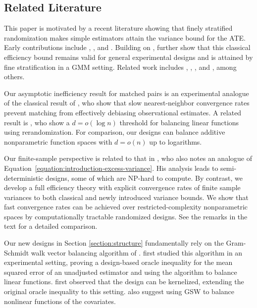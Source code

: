 \documentclass[letterpaper,12pt]{article}
\theoremstyle{definition}
\numberwithin{equation}{section}
\begin{document}
\subsection{Related Literature}

This paper is motivated by a recent literature showing that finely stratified randomization makes simple estimators attain the \citet{hahn1998} variance bound for the ATE.
Early contributions include \citet{bai2021inference}, \citet{bai2020pairs}, and \citet{cytrynbaum2022local}.
Building on \citet{armstrong2022}, \citet{bai2023efficiency} further show that this classical efficiency bound remains valid for general experimental designs and is attained by fine stratification in a GMM setting.
Related work includes \citet{imai2008}, \citet{fogarty2018}, \citet{pashley2021}, and \citet{kapelner2022}, among others.

Our asymptotic inefficiency result for matched pairs is an experimental analogue of the classical result of \citet{abadie2006large}, who show that slow nearest-neighbor convergence rates prevent matching from effectively debiasing observational estimates.
A related result is \citet{wang2022rerandomization}, who show a $d=o(\log n)$ threshold for balancing linear functions using rerandomization.
For comparison, our designs can balance additive nonparametric function spaces with $d = o(n)$ up to logarithms.  

Our finite-sample perspective is related to that in \citet{kallus2018}, who also notes an analogue of Equation~\eqref{equation:introduction-excess-variance}. 
His analysis leads to semi-deterministic designs, some of which are NP-hard to compute. 
By contrast, we develop a full efficiency theory with explicit convergence rates of finite sample variances to both classical and newly introduced variance bounds.
We show that fast convergence rates can be achieved over restricted-complexity nonparametric spaces by computationally tractable randomized designs. 
See the remarks in the text for a detailed comparison. 

Our new designs in Section \ref{section:structure} fundamentally rely on the Gram-Schmidt walk vector balancing algorithm of \citet{bansal2019gram}.
\citet{harshaw2024gsw} first studied this algorithm in an experimental setting, proving a design-based oracle inequality for the mean squared error of an unadjusted estimator and using the algorithm to balance linear functions.
\citet{harshaw2021dissertation} first observed that the design can be kernelized, extending the original oracle inequality to this setting.
\citet{chen2026nonlinear} also suggest using GSW to balance nonlinear functions of the covariates.
\end{document}
